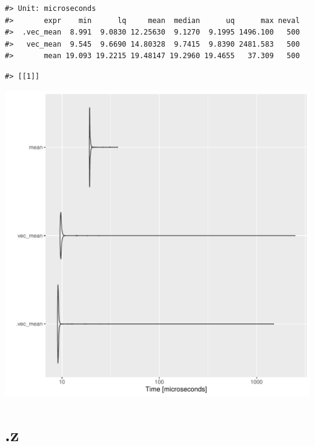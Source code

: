 \documentclass{article}\usepackage[]{graphicx}\usepackage[]{color}
\makeatletter
\newenvironment{kframe}{%
 \def\at@end@of@kframe{}%
 \ifinner\ifhmode%
  \def\at@end@of@kframe{\end{minipage}}%
  \begin{minipage}{\columnwidth}%
 \fi\fi%
 \def\FrameCommand##1{\hskip\@totalleftmargin \hskip-\fboxsep
 \colorbox{shadecolor}{##1}\hskip-\fboxsep
     \hskip-\linewidth \hskip-\@totalleftmargin \hskip\columnwidth}%
 \MakeFramed {\advance\hsize-\width
   \@totalleftmargin\z@ \linewidth\hsize
   \@setminipage}}%
 {\par\unskip\endMakeFramed%
 \at@end@of@kframe}
\newenvironment{knitrout}{}{} %
\makeatother
\begin{document}
\begin{knitrout}
\color{fgcolor}\begin{kframe}
\begin{verbatim}
#> Unit: microseconds
#>       expr    min      lq     mean  median      uq      max neval
#>  .vec_mean  8.991  9.0830 12.25630  9.1270  9.1995 1496.100   500
#>   vec_mean  9.545  9.6690 14.80328  9.7415  9.8390 2481.583   500
#>       mean 19.093 19.2215 19.48147 19.2960 19.4655   37.309   500
\end{verbatim}


{\ttfamily\noindent\itshape\color{messagecolor}{\#> Coordinate system already present. Adding new coordinate system, which will replace the existing one.}}\begin{verbatim}
#> [[1]]
\end{verbatim}
\end{kframe}
\includegraphics[width=1\linewidth]{man/figures/latex-test-benchmark-linearAlgebra-vec-mean-dot-1} 

\end{knitrout}

\newpage

\section{.z}
\end{document}
